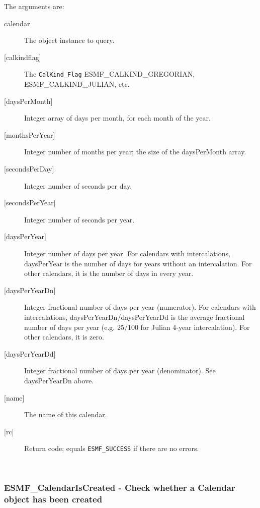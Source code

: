        The arguments are:
       \begin{description}
       \item[calendar]
            The object instance to query.
       \item[{[calkindflag]}]
            The {\tt CalKind\_Flag} ESMF\_CALKIND\_GREGORIAN, 
            ESMF\_CALKIND\_JULIAN, etc.
       \item[{[daysPerMonth]}]
            Integer array of days per month, for each month of the year.
       \item[{[monthsPerYear]}]
            Integer number of months per year; the size of the
            daysPerMonth array.
       \item[{[secondsPerDay]}]
            Integer number of seconds per day.
       \item[{[secondsPerYear]}]
            Integer number of seconds per year.
       \item[{[daysPerYear]}]
            Integer number of days per year.  For calendars with
            intercalations, daysPerYear is the number of days for years without
            an intercalation.  For other calendars, it is the number of days in
            every year.
       \item[{[daysPerYearDn]}]
            \begin{sloppypar}
            Integer fractional number of days per year (numerator).
            For calendars with intercalations, daysPerYearDn/daysPerYearDd is
            the average fractional number of days per year (e.g. 25/100 for
            Julian 4-year intercalation).  For other calendars, it is zero.
            \end{sloppypar}
       \item[{[daysPerYearDd]}]
            Integer fractional number of days per year (denominator).  See
            daysPerYearDn above.
       \item[{[name]}]
            The name of this calendar.
       \item[{[rc]}]
            Return code; equals {\tt ESMF\_SUCCESS} if there are no errors.
       \end{description}
        
 
\mbox{}\hrulefill\ 
 
\subsubsection [ESMF\_CalendarIsCreated] {ESMF\_CalendarIsCreated - Check whether a Calendar object has been created}


